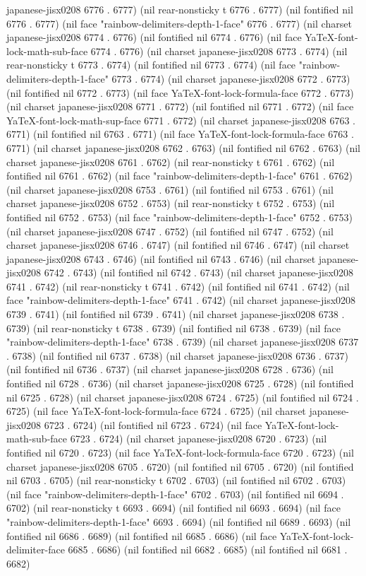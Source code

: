japanese-jisx0208 6776 . 6777) (nil rear-nonsticky t 6776 . 6777) (nil fontified nil 6776 . 6777) (nil face "rainbow-delimiters-depth-1-face" 6776 . 6777) (nil charset japanese-jisx0208 6774 . 6776) (nil fontified nil 6774 . 6776) (nil face YaTeX-font-lock-math-sub-face 6774 . 6776) (nil charset japanese-jisx0208 6773 . 6774) (nil rear-nonsticky t 6773 . 6774) (nil fontified nil 6773 . 6774) (nil face "rainbow-delimiters-depth-1-face" 6773 . 6774) (nil charset japanese-jisx0208 6772 . 6773) (nil fontified nil 6772 . 6773) (nil face YaTeX-font-lock-formula-face 6772 . 6773) (nil charset japanese-jisx0208 6771 . 6772) (nil fontified nil 6771 . 6772) (nil face YaTeX-font-lock-math-sup-face 6771 . 6772) (nil charset japanese-jisx0208 6763 . 6771) (nil fontified nil 6763 . 6771) (nil face YaTeX-font-lock-formula-face 6763 . 6771) (nil charset japanese-jisx0208 6762 . 6763) (nil fontified nil 6762 . 6763) (nil charset japanese-jisx0208 6761 . 6762) (nil rear-nonsticky t 6761 . 6762) (nil fontified nil 6761 . 6762) (nil face "rainbow-delimiters-depth-1-face" 6761 . 6762) (nil charset japanese-jisx0208 6753 . 6761) (nil fontified nil 6753 . 6761) (nil charset japanese-jisx0208 6752 . 6753) (nil rear-nonsticky t 6752 . 6753) (nil fontified nil 6752 . 6753) (nil face "rainbow-delimiters-depth-1-face" 6752 . 6753) (nil charset japanese-jisx0208 6747 . 6752) (nil fontified nil 6747 . 6752) (nil charset japanese-jisx0208 6746 . 6747) (nil fontified nil 6746 . 6747) (nil charset japanese-jisx0208 6743 . 6746) (nil fontified nil 6743 . 6746) (nil charset japanese-jisx0208 6742 . 6743) (nil fontified nil 6742 . 6743) (nil charset japanese-jisx0208 6741 . 6742) (nil rear-nonsticky t 6741 . 6742) (nil fontified nil 6741 . 6742) (nil face "rainbow-delimiters-depth-1-face" 6741 . 6742) (nil charset japanese-jisx0208 6739 . 6741) (nil fontified nil 6739 . 6741) (nil charset japanese-jisx0208 6738 . 6739) (nil rear-nonsticky t 6738 . 6739) (nil fontified nil 6738 . 6739) (nil face "rainbow-delimiters-depth-1-face" 6738 . 6739) (nil charset japanese-jisx0208 6737 . 6738) (nil fontified nil 6737 . 6738) (nil charset japanese-jisx0208 6736 . 6737) (nil fontified nil 6736 . 6737) (nil charset japanese-jisx0208 6728 . 6736) (nil fontified nil 6728 . 6736) (nil charset japanese-jisx0208 6725 . 6728) (nil fontified nil 6725 . 6728) (nil charset japanese-jisx0208 6724 . 6725) (nil fontified nil 6724 . 6725) (nil face YaTeX-font-lock-formula-face 6724 . 6725) (nil charset japanese-jisx0208 6723 . 6724) (nil fontified nil 6723 . 6724) (nil face YaTeX-font-lock-math-sub-face 6723 . 6724) (nil charset japanese-jisx0208 6720 . 6723) (nil fontified nil 6720 . 6723) (nil face YaTeX-font-lock-formula-face 6720 . 6723) (nil charset japanese-jisx0208 6705 . 6720) (nil fontified nil 6705 . 6720) (nil fontified nil 6703 . 6705) (nil rear-nonsticky t 6702 . 6703) (nil fontified nil 6702 . 6703) (nil face "rainbow-delimiters-depth-1-face" 6702 . 6703) (nil fontified nil 6694 . 6702) (nil rear-nonsticky t 6693 . 6694) (nil fontified nil 6693 . 6694) (nil face "rainbow-delimiters-depth-1-face" 6693 . 6694) (nil fontified nil 6689 . 6693) (nil fontified nil 6686 . 6689) (nil fontified nil 6685 . 6686) (nil face YaTeX-font-lock-delimiter-face 6685 . 6686) (nil fontified nil 6682 . 6685) (nil fontified nil 6681 . 6682) 